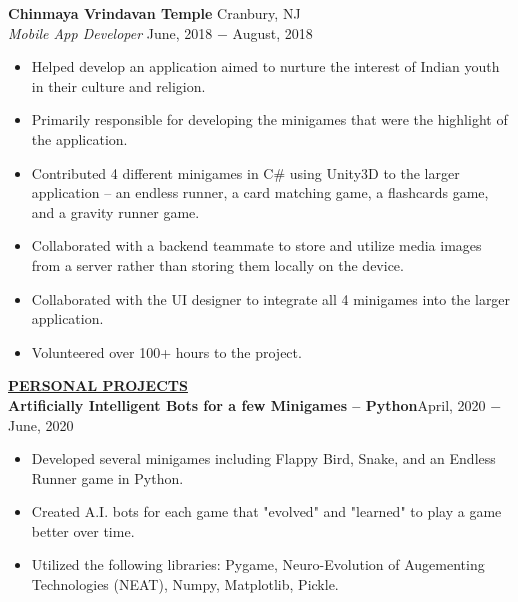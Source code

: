 \documentclass{article}
\begin{document}
\noindent \textbf{Chinmaya Vrindavan Temple} \hfill Cranbury, NJ \\
\textit{Mobile App Developer} \hfill June, 2018 $-$ August, 2018
\begin{itemize}[noitemsep,nolistsep,leftmargin=*]
\item {Helped develop an application aimed to nurture the interest of Indian youth in their culture and religion.}
\item {Primarily responsible for developing the minigames that were the highlight of the application.}
\item {Contributed 4 different minigames in C\# using Unity3D to the larger application -- an endless runner, a card matching game, a flashcards game, and a gravity runner game.}
\item {Collaborated with a backend teammate to store and utilize media images from a server rather than storing them locally on the device.}
\item {Collaborated with the UI designer to integrate all 4 minigames into the larger application.}
\item {Volunteered over 100+ hours to the project.}\\
\end{itemize}

%
%
\noindent \textbf{\underline{PERSONAL PROJECTS}} \\
\noindent \textbf{Artificially Intelligent Bots for a few Minigames -- Python}\hfill  April, 2020 $-$ June, 2020
\begin{itemize}[noitemsep,nolistsep,leftmargin=*]
\item {Developed several minigames including Flappy Bird, Snake, and an Endless Runner game in Python.}
\item {Created A.I. bots for each game that "evolved" and "learned" to play a game better over time.}
\item {Utilized the following libraries: Pygame, Neuro-Evolution of Augementing Technologies (NEAT), Numpy, Matplotlib, Pickle.}\\
\end{itemize}
\end{document}
